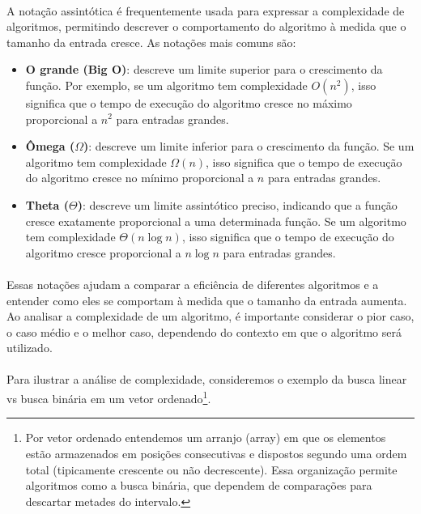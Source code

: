 \documentclass[12pt,a4paper]{article}
\begin{document}
\paragraph{}
A notação assintótica é frequentemente usada para expressar a complexidade de algoritmos, permitindo descrever o comportamento do algoritmo à medida que o tamanho da entrada cresce. As notações mais comuns são:
\begin{itemize}\setlength{\itemsep}{2pt}
    \item \textbf{O grande (Big O)}: descreve um limite superior para o crescimento da função. Por exemplo, se um algoritmo tem complexidade \(O(n^2)\), isso significa que o tempo de execução do algoritmo cresce no máximo proporcional a \(n^2\) para entradas grandes.
    \item \textbf{Ômega (\(\Omega\))}: descreve um limite inferior para o crescimento da função. Se um algoritmo tem complexidade \(\Omega(n)\), isso significa que o tempo de execução do algoritmo cresce no mínimo proporcional a \(n\) para entradas grandes.
    \item \textbf{Theta (\(\Theta\))}: descreve um limite assintótico preciso, indicando que a função cresce exatamente proporcional a uma determinada função. Se um algoritmo tem complexidade \(\Theta(n \log n)\), isso significa que o tempo de execução do algoritmo cresce proporcional a \(n \log n\) para entradas grandes.
\end{itemize}

\paragraph{}
Essas notações ajudam a comparar a eficiência de diferentes algoritmos e a entender como eles se comportam à medida que o tamanho da entrada aumenta. Ao analisar a complexidade de um algoritmo, é importante considerar o pior caso, o caso médio e o melhor caso, dependendo do contexto em que o algoritmo será utilizado.

\paragraph{}
Para ilustrar a análise de complexidade, consideremos o exemplo da busca linear vs busca binária em um vetor ordenado\footnote{Por vetor ordenado entendemos um arranjo (array) em que os elementos estão armazenados em posições consecutivas e dispostos segundo uma ordem total (tipicamente crescente ou não decrescente). Essa organização permite algoritmos como a busca binária, que dependem de comparações para descartar metades do intervalo.}. 
\end{document}
